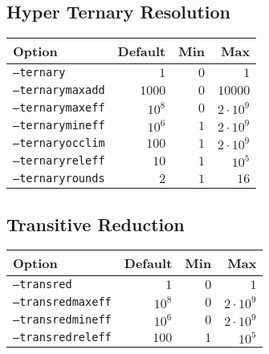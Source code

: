 \documentclass{article}
\begin{document}
\subsection{Hyper Ternary Resolution}
\begin{tabular}{l|rrr}
    Option & Default & Min & Max \\
    \hline
    \texttt{--ternary}       & $1$    & $0$  & $1$ \\
    \texttt{--ternarymaxadd} & $1000$ & $0$  & $10000$ \\
    \texttt{--ternarymaxeff} & $10^8$ & $0$  & $2 \cdot 10^9$ \\
    \texttt{--ternarymineff} & $10^6$ & $1$  & $2 \cdot 10^9$ \\
    \texttt{--ternaryocclim} & $100$  & $1$  & $2 \cdot 10^9$ \\
    \texttt{--ternaryreleff} & $10$   & $1$  & $10^5$ \\
    \texttt{--ternaryrounds} & $2$    & $1$  & $16$ \\
\end{tabular}

\subsection{Transitive Reduction}
\begin{tabular}{l|rrr}
    Option & Default & Min & Max \\
    \hline
    \texttt{--transred}       & $1$    & $0$  & $1$ \\
    \texttt{--transredmaxeff} & $10^8$ & $0$  & $2 \cdot 10^9$ \\
    \texttt{--transredmineff} & $10^6$ & $0$  & $2 \cdot 10^9$ \\
    \texttt{--transredreleff} & $100$  & $1$  & $10^5$ \\
\end{tabular}
\end{document}
